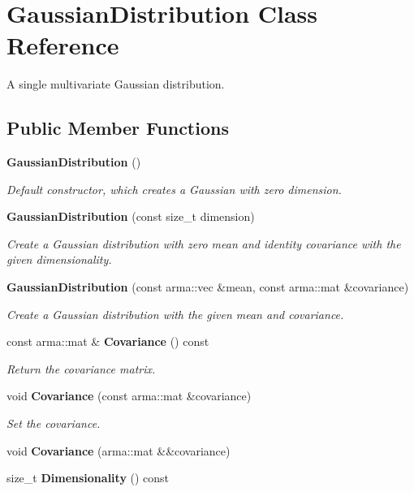 \section{Gaussian\+Distribution Class Reference}
\label{classmlpack_1_1distribution_1_1GaussianDistribution}


A single multivariate Gaussian distribution.  


\subsection*{Public Member Functions}
\begin{DoxyCompactItemize}
\item 
\textbf{ Gaussian\+Distribution} ()
\begin{DoxyCompactList}\small\item\em Default constructor, which creates a Gaussian with zero dimension. \end{DoxyCompactList}\item 
\textbf{ Gaussian\+Distribution} (const size\+\_\+t dimension)
\begin{DoxyCompactList}\small\item\em Create a Gaussian distribution with zero mean and identity covariance with the given dimensionality. \end{DoxyCompactList}\item 
\textbf{ Gaussian\+Distribution} (const arma\+::vec \&mean, const arma\+::mat \&covariance)
\begin{DoxyCompactList}\small\item\em Create a Gaussian distribution with the given mean and covariance. \end{DoxyCompactList}\item 
const arma\+::mat \& \textbf{ Covariance} () const
\begin{DoxyCompactList}\small\item\em Return the covariance matrix. \end{DoxyCompactList}\item 
void \textbf{ Covariance} (const arma\+::mat \&covariance)
\begin{DoxyCompactList}\small\item\em Set the covariance. \end{DoxyCompactList}\item 
void \textbf{ Covariance} (arma\+::mat \&\&covariance)
\item 
size\+\_\+t \textbf{ Dimensionality} () const

\end{DoxyCompactItemize}
